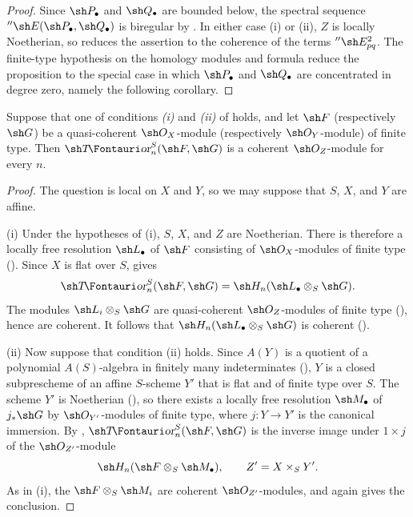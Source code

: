 \begin{proof}
Since $\sh P_\bullet$ and $\sh Q_\bullet$ are bounded below, the
spectral sequence
$''\sh E(\sh P_\bullet,\sh Q_\bullet)$ is biregular by
.  In either case (i) or (ii), $Z$ is locally
Noetherian, so  reduces the assertion to the
coherence of the terms $''\sh E_{pq}^2$.  The finite-type
hypothesis on the homology modules and formula
 reduce the proposition to the special case in
which $\sh P_\bullet$ and $\sh Q_\bullet$ are concentrated in
degree zero, namely the following corollary.
\end{proof}

\begin{corollary}[6.5.14]
\label{III.6.5.14}
Suppose that one of conditions \emph{(i)} and \emph{(ii)} of
 holds, and let $\sh F$ (respectively $\sh G$)
be a quasi-coherent $\sh O_X$-module (respectively
$\sh O_Y$-module) of finite type.  Then
$\shTor_n^S(\sh F,\sh G)$ is a coherent $\sh O_Z$-module for
every $n$.
\end{corollary}

\begin{proof}
The question is local on $X$ and $Y$, so we may suppose that
$S$, $X$, and $Y$ are affine.

\textnormal{(i)} Under the hypotheses of (i), $S$, $X$, and $Z$
are Noetherian.  There is therefore a locally free resolution
$\sh L_\bullet$ of $\sh F$ consisting of $\sh O_X$-modules of
finite type ().  Since $X$ is flat over $S$,
 gives
\[
  \shTor_n^S(\sh F,\sh G)
  =
  \sh H_n(\sh L_\bullet\otimes_S\sh G).
\]
The modules $\sh L_i\otimes_S\sh G$ are quasi-coherent
$\sh O_Z$-modules of finite type (), hence are
coherent.  It follows that
$\sh H_n(\sh L_\bullet\otimes_S\sh G)$ is coherent
().

\textnormal{(ii)} Now suppose that condition (ii) holds.  Since
$A(Y)$ is a quotient of a polynomial $A(S)$-algebra in finitely
many indeterminates (), $Y$ is a closed
subprescheme of an affine $S$-scheme $Y'$ that is flat and of
finite type over $S$.  The scheme $Y'$ is Noetherian
(), so there exists a locally free resolution
$\sh M_\bullet$ of $j_*\sh G$ by $\sh O_{Y'}$-modules of finite
type, where $j:Y\to Y'$ is the canonical immersion.  By
, $\shTor_n^S(\sh F,\sh G)$ is the inverse image
under $1\times j$ of the $\sh O_{Z'}$-module
\[
  \sh H_n(\sh F\otimes_S\sh M_\bullet),
  \qquad Z'=X\times_SY'.
\]
As in (i), the $\sh F\otimes_S\sh M_i$ are coherent
$\sh O_{Z'}$-modules, and  again gives the
conclusion.
\end{proof}

